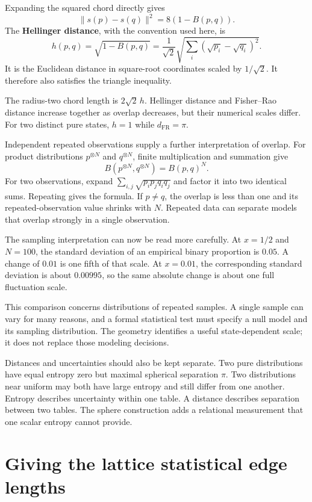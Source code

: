 \documentclass[11pt,oneside,openany]{book}
\theoremstyle{definition}
\theoremstyle{remark}
\numberwithin{equation}{chapter}
\begin{document}
Expanding the squared chord directly gives \[\|s(p)-s(q)\|^2=8(1-B(p,q)).\] The \textbf{Hellinger distance}, with the convention used here, is \[h(p,q)=\sqrt{1-B(p,q)}
=\frac1{\sqrt2}\sqrt{\sum_i(\sqrt{p_i}-\sqrt{q_i})^2}.\] It is the Euclidean distance in square-root coordinates scaled by \(1/\sqrt2\). It therefore also satisfies the triangle inequality.

The radius-two chord length is \(2\sqrt2\,h\). Hellinger distance and Fisher--Rao distance increase together as overlap decreases, but their numerical scales differ. For two distinct pure states, \(h=1\) while \(d_{\mathrm{FR}}=\pi\).

Independent repeated observations supply a further interpretation of overlap. For product distributions \(p^{\otimes N}\) and \(q^{\otimes N}\), finite multiplication and summation give \[B(p^{\otimes N},q^{\otimes N})=B(p,q)^N.\] For two observations, expand \(\sum_{i,j}\sqrt{p_ip_jq_iq_j}\) and factor it into two identical sums. Repeating gives the formula. If \(p\ne q\), the overlap is less than one and its repeated-observation value shrinks with \(N\). Repeated data can separate models that overlap strongly in a single observation.

The sampling interpretation can now be read more carefully. At \(x=1/2\) and \(N=100\), the standard deviation of an empirical binary proportion is \(0.05\). A change of \(0.01\) is one fifth of that scale. At \(x=0.01\), the corresponding standard deviation is about \(0.00995\), so the same absolute change is about one full fluctuation scale.

This comparison concerns distributions of repeated samples. A single sample can vary for many reasons, and a formal statistical test must specify a null model and its sampling distribution. The geometry identifies a useful state-dependent scale; it does not replace those modeling decisions.

Distances and uncertainties should also be kept separate. Two pure distributions have equal entropy zero but maximal spherical separation \(\pi\). Two distributions near uniform may both have large entropy and still differ from one another. Entropy describes uncertainty within one table. A distance describes separation between two tables. The sphere construction adds a relational measurement that one scalar entropy cannot provide.

\section{Giving the lattice statistical edge lengths}\label{ch07-giving-the-lattice-statistical-edge-lengths}
\end{document}
